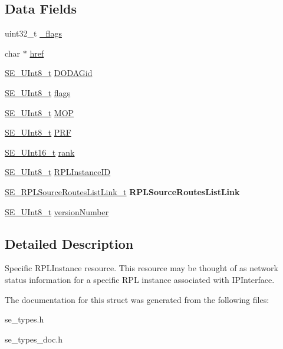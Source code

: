 \subsection*{Data Fields}
\begin{DoxyCompactItemize}
\item 
uint32\+\_\+t \hyperlink{group__RPLInstance_ga915b676adc88c489d4e4c8f66d306819}{\+\_\+flags}
\item 
char $\ast$ \hyperlink{group__RPLInstance_gad7342c6b8b1b213decb3e5b625c1fba6}{href}
\item 
\hyperlink{group__UInt8_gaf7c365a1acfe204e3a67c16ed44572f5}{S\+E\+\_\+\+U\+Int8\+\_\+t} \hyperlink{group__RPLInstance_gada9d3472a6be71b1180ba77a6e919bdf}{D\+O\+D\+A\+Gid}
\item 
\hyperlink{group__UInt8_gaf7c365a1acfe204e3a67c16ed44572f5}{S\+E\+\_\+\+U\+Int8\+\_\+t} \hyperlink{group__RPLInstance_ga0148c5566a77d44da206ea45559c1f63}{flags}
\item 
\hyperlink{group__UInt8_gaf7c365a1acfe204e3a67c16ed44572f5}{S\+E\+\_\+\+U\+Int8\+\_\+t} \hyperlink{group__RPLInstance_ga7aa19d5e2130614971d02df0f802544b}{M\+OP}
\item 
\hyperlink{group__UInt8_gaf7c365a1acfe204e3a67c16ed44572f5}{S\+E\+\_\+\+U\+Int8\+\_\+t} \hyperlink{group__RPLInstance_ga6dee29098403067a7d66d7e44e3f0987}{P\+RF}
\item 
\hyperlink{group__UInt16_gac68d541f189538bfd30cfaa712d20d29}{S\+E\+\_\+\+U\+Int16\+\_\+t} \hyperlink{group__RPLInstance_ga7647975b9cf14e69fd31839aec60594b}{rank}
\item 
\hyperlink{group__UInt8_gaf7c365a1acfe204e3a67c16ed44572f5}{S\+E\+\_\+\+U\+Int8\+\_\+t} \hyperlink{group__RPLInstance_ga9582d2254e7cee7d1b4c6665b6530088}{R\+P\+L\+Instance\+ID}
\item 
\hyperlink{structSE__RPLSourceRoutesListLink__t}{S\+E\+\_\+\+R\+P\+L\+Source\+Routes\+List\+Link\+\_\+t} {\bfseries R\+P\+L\+Source\+Routes\+List\+Link}
\item 
\hyperlink{group__UInt8_gaf7c365a1acfe204e3a67c16ed44572f5}{S\+E\+\_\+\+U\+Int8\+\_\+t} \hyperlink{group__RPLInstance_gaf6df9d11f50aa3ba36f4c9cd14b71314}{version\+Number}
\end{DoxyCompactItemize}


\subsection{Detailed Description}
Specific R\+P\+L\+Instance resource. This resource may be thought of as network status information for a specific R\+PL instance associated with I\+P\+Interface. 

The documentation for this struct was generated from the following files\+:\begin{DoxyCompactItemize}
\item 
se\+\_\+types.\+h\item 
se\+\_\+types\+\_\+doc.\+h\end{DoxyCompactItemize}
